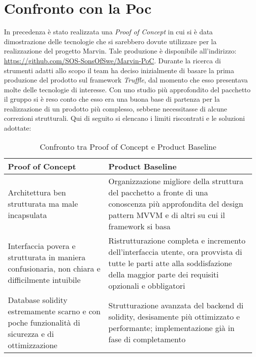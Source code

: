 \section{Confronto con la Poc}
In precedenza è stato realizzata una \emph{Proof of Concept} in cui si è data dimostrazione delle tecnologie che si sarebbero dovute utilizzare per la realizzazione del progetto Marvin.
Tale produzione è disponibile all'indirizzo: \url{https://github.com/SOS-SonsOfSwe/Marvin-PoC}.
Durante la ricerca di strumenti adatti allo scopo il team ha deciso inizialmente di basare la prima produzione del prodotto sul framework \emph{Truffle}, dal momento che esso presentava molte delle tecnologie di interesse.
Con uno studio più approfondito del pacchetto il gruppo si è reso conto che esso era una buona base di partenza per la realizzazione di un prodotto più complesso, sebbene necessitasse di alcune correzioni strutturali. Qui di seguito si elencano i limiti riscontrati e le soluzioni adottate:
\newline
\newline

\begin{table}[hp]
	\centering
\begin{tabular}{|p{6cm}|p{6cm}|}
	\hline
	\textbf{Proof of Concept} & \textbf{Product Baseline} \\
	
	\hline Architettura ben strutturata ma male incapsulata
	&
	Organizzazione migliore della struttura del pacchetto
	a fronte di una conoscenza più approfondita del design pattern MVVM e di altri su cui il framework si basa \\ 
	
	\hline Interfaccia povera e strutturata in maniera confusionaria, non chiara e  difficilmente intuibile 
	&
	Ristrutturazione completa e incremento dell'interfaccia utente, ora provvista di tutte le parti atte alla soddisfazione della maggior parte dei requisiti opzionali e obbligatori \\ 
	
	\hline Database solidity estremamente scarno e con poche funzionalità di sicurezza e di ottimizzazione
	&
	Strutturazione avanzata del backend di solidity, desisamente più ottimizzato e performante; implementazione già in fase di completamento\\
	
	\hline
\end{tabular}
\caption{Confronto tra Proof of Concept e Product Baseline}
\end{table}